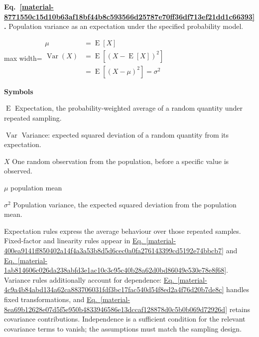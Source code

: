 \documentclass[11pt,a4paper]{article}
\begin{document}
\par\medskip
\begin{samepage}
\label{material-8771550c15d10b63af18bf44b8c593566d25787e70ff36df713ef21dd1c66393}
\noindent\textbf{Eq.~\ref*{material-8771550c15d10b63af18bf44b8c593566d25787e70ff36df713ef21dd1c66393}.} Population variance as an expectation under the specified probability model.\par\nopagebreak
\begin{center}\begin{adjustbox}{max width=\linewidth}$\displaystyle \begin{aligned}\mu&=\operatorname{E}[X]\\\operatorname{Var}(X)&=\operatorname{E}[(X-\operatorname{E}[X])^2]\\&=\operatorname{E}[(X-\mu)^2]=\sigma^2\end{aligned}$\end{adjustbox}\end{center}

\par\noindent\textbf{Symbols}

\par\noindent\textbf{\(\operatorname{E}\)} Expectation, the probability-weighted average of a random quantity under repeated sampling.

\par\noindent\textbf{\(\operatorname{Var}\)} Variance: expected squared deviation of a random quantity from its expectation.

\par\noindent\textbf{\(X\)} One random observation from the population, before a specific value is observed.

\par\noindent\textbf{\(\mu\)} population mean

\par\noindent\textbf{\(\sigma^2\)} Population variance, the expected squared deviation from the population mean.

\end{samepage}
\medskip

Expectation rules express the average behaviour over those repeated samples. Fixed-factor and linearity rules appear in \hyperref[material-400ea9141ff850402a14f4a3a53b8d5d6cec0a0fa276143399cd5192e74bbcb7]{Eq.~\ref*{material-400ea9141ff850402a14f4a3a53b8d5d6cec0a0fa276143399cd5192e74bbcb7}} and \hyperref[material-1ab814606c026da238abfd3e1ac10c3c95c40b28a62d0bd86049e530e78e8f68]{Eq.~\ref*{material-1ab814606c026da238abfd3e1ac10c3c95c40b28a62d0bd86049e530e78e8f68}}. Variance rules additionally account for dependence: \hyperref[material-4c9a4b84abd134a62ca883706031fdf3bc17fac540d54f8ed2a4f76d20b7de8c]{Eq.~\ref*{material-4c9a4b84abd134a62ca883706031fdf3bc17fac540d54f8ed2a4f76d20b7de8c}} handles fixed transformations, and \hyperref[material-8ea69b12628e07d5f5e950b4833946586e13dccaf128878d0c5b0b069d72926d]{Eq.~\ref*{material-8ea69b12628e07d5f5e950b4833946586e13dccaf128878d0c5b0b069d72926d}} retains covariance contributions. Independence is a sufficient condition for the relevant covariance terms to vanish; the assumptions must match the sampling design.
\end{document}

